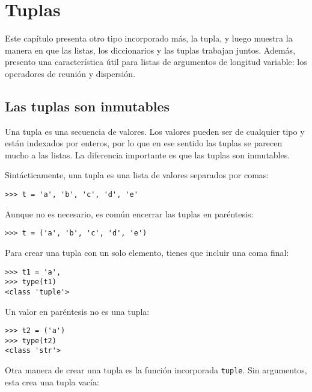\documentclass[10pt]{book}
\begin{document}
\chapter{Tuplas}
\label{tuplechap}

Este capítulo presenta otro tipo incorporado más, la tupla, y luego
muestra la manera en que las listas, los diccionarios y las tuplas trabajan juntos.
Además, presento una característica útil para listas de argumentos de longitud variable:
los operadores de reunión y dispersión.



\section{Las tuplas son inmutables}

Una tupla es una secuencia de valores.  Los valores pueden ser de cualquier tipo y 
están indexados por enteros, por lo que en ese sentido las tuplas se parecen mucho
a las listas.  La diferencia importante es que las tuplas son inmutables.

Sintácticamente, una tupla es una lista de valores separados por comas:

\begin{verbatim}
>>> t = 'a', 'b', 'c', 'd', 'e'
\end{verbatim}
%
Aunque no es necesario, es común encerrar las tuplas en
paréntesis:

\begin{verbatim}
>>> t = ('a', 'b', 'c', 'd', 'e')
\end{verbatim}
%
Para crear una tupla con un solo elemento, tienes que incluir una coma
final:

\begin{verbatim}
>>> t1 = 'a',
>>> type(t1)
<class 'tuple'>
\end{verbatim}
%
Un valor en paréntesis no es una tupla:

\begin{verbatim}
>>> t2 = ('a')
>>> type(t2)
<class 'str'>
\end{verbatim}
%
Otra manera de crear una tupla es la función incorporada {\tt tuple}.
Sin argumentos, esta crea una tupla vacía:
\end{document}
